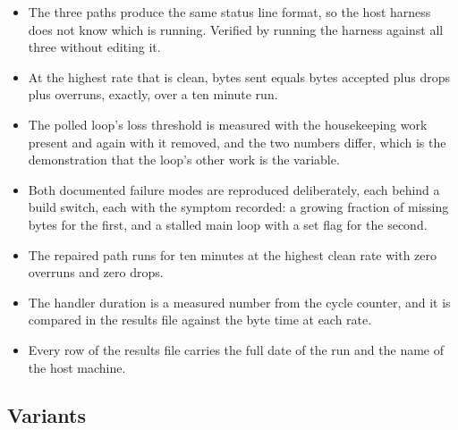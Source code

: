 \begin{itemize}
\item The three paths produce the same status line format, so the host harness
does not know which is running. Verified by running the harness against all
three without editing it.
\item At the highest rate that is clean, bytes sent equals bytes accepted plus
drops plus overruns, exactly, over a ten minute run.
\item The polled loop's loss threshold is measured with the housekeeping work
present and again with it removed, and the two numbers differ, which is the
demonstration that the loop's other work is the variable.
\item Both documented failure modes are reproduced deliberately, each behind a
build switch, each with the symptom recorded: a growing fraction of missing
bytes for the first, and a stalled main loop with a set flag for the second.
\item The repaired path runs for ten minutes at the highest clean rate with zero
overruns and zero drops.
\item The handler duration is a measured number from the cycle counter, and it
is compared in the results file against the byte time at each rate.
\item Every row of the results file carries the full date of the run and the
name of the host machine.
\end{itemize}

\subsection*{Variants}

